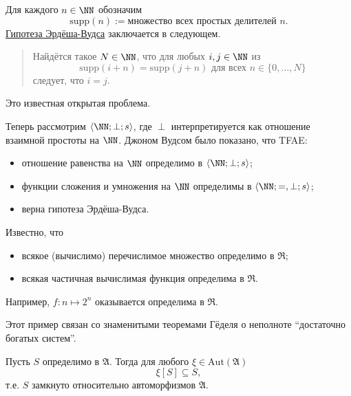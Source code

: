 \documentclass[12pt,a4paper]{article}
\newcommand{\Aut}{\ensuremath{\mathrm{Aut}}\xspace}
\newcommand{\supp}{\ensuremath{\mathrm{supp}}\xspace}
\begin{document}
    \begin{example}
        Для каждого $n \in \NN$ обозначим
        \[\supp(n) := \text{множество всех простых делителей $n$}.\]
        \href{https://en.wikipedia.org/wiki/Erd\%C5\%91s\%E2\%80\%93Woods_number}{Гипотеза Эрдёша-Вудса} заключается в следующем.
        \begin{quotation}
            Найдётся такое $N \in \NN$, что для любых $i, j \in \NN$ из
            \[\supp(i+n) = \supp(j+n) \text{ для всех } n \in \{0, \dots, N\}\]
            следует, что $i = j$.
        \end{quotation}
        Это известная открытая проблема.

        Теперь рассмотрим $\langle \NN; \perp; s \rangle$, где $\perp$ интерпретируется как отношение взаимной простоты на $\NN$. Джоном Вудсом было показано, что TFAE:
        \begin{itemize}
            \item отношение равенства на $\NN$ определимо в $\langle \NN; \perp; s \rangle$;
            \item функции сложения и умножения на $\NN$ определимы в $\langle \NN; {=}, \perp; s \rangle$;
            \item верна гипотеза Эрдёша-Вудса.
        \end{itemize}
    \end{example}

    \begin{example}
        Известно, что
        \begin{itemize}
            \item всякое (вычислимо) перечислимое множество определимо в \hyperlink{R-structure-definition}{$\mathfrak{R}$};
            \item всякая частичная вычислимая функция определима в $\mathfrak{R}$.
        \end{itemize}
        Например, $f: n \mapsto 2^n$ оказывается определима в $\mathfrak{R}$.

        Этот пример связан со знаменитыми теоремами Гёделя о неполноте ``достаточно богатых систем''.
    \end{example}

    \begin{theorem}
        Пусть $S$ определимо в $\mathfrak{A}$. Тогда для любого $\xi \in \Aut(\mathfrak{A})$
        \[\xi[S] \subseteq S,\]
        т.е. $S$ замкнуто относительно автоморфизмов $\mathfrak{A}$.
    \end{theorem}
\end{document}
